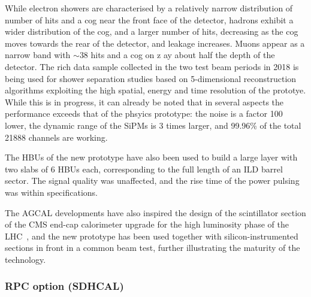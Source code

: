 While electron showers are characterised by a relatively narrow distribution of number of hits and a cog near the front face of the detector, hadrons exhibit a wider distribution of the cog, and a larger number of hits, decreasing as the cog moves towards the rear of the detector, and leakage increases.
Muons appear as a narrow band with $\sim 38$ hits and a cog on z ay about half the depth of the detector. 
%
%
The rich data sample collected in the two test beam periods in 2018  is being used for shower separation studies based on 5-dimensional reconstruction algorithms exploiting the high spatial, energy and time resolution of the prototye. 
While this is in progress, it can already be noted that in several aspects the  performance exceeds that of the phsyics prototype: the noise is a factor 100 lower, the dynamic range of the SiPMs is 3 times larger, and 99.96\% of the total 21888 channels are working.

The HBUs of the new prototype have also been used to build a large layer with two slabs of 6 HBUs each, corresponding to the full length of an ILD barrel sector. The signal quality was unaffected, and the rise time of the power pulsing was within specifications. 

The AGCAL developments have also inspired the design of the scintillator section of the CMS end-cap calorimeter upgrade for the high luminosity phase of the LHC~\cite{Collaboration:2293646}, and the new prototype has been used together with silicon-instrumented sections in front in a common beam test, further illustrating the maturity of the technology. 

\subsubsection{RPC option (SDHCAL)}

